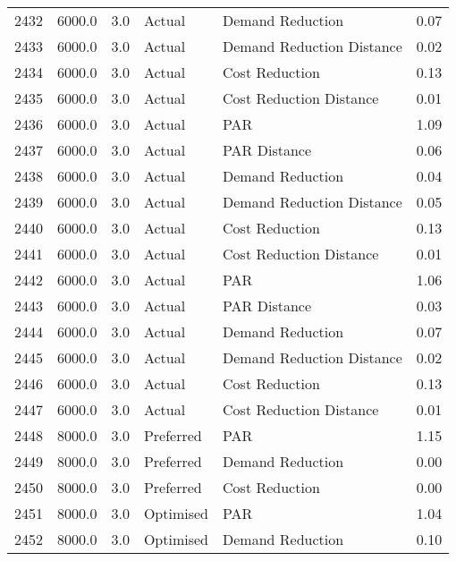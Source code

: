 \begin{longtable}{lrrllr}
2432 &       6000.0 &     3.0 &         Actual &           Demand Reduction &   0.07 \\
2433 &       6000.0 &     3.0 &         Actual &  Demand Reduction Distance &   0.02 \\
2434 &       6000.0 &     3.0 &         Actual &             Cost Reduction &   0.13 \\
2435 &       6000.0 &     3.0 &         Actual &    Cost Reduction Distance &   0.01 \\
2436 &       6000.0 &     3.0 &         Actual &                        PAR &   1.09 \\
2437 &       6000.0 &     3.0 &         Actual &               PAR Distance &   0.06 \\
2438 &       6000.0 &     3.0 &         Actual &           Demand Reduction &   0.04 \\
2439 &       6000.0 &     3.0 &         Actual &  Demand Reduction Distance &   0.05 \\
2440 &       6000.0 &     3.0 &         Actual &             Cost Reduction &   0.13 \\
2441 &       6000.0 &     3.0 &         Actual &    Cost Reduction Distance &   0.01 \\
2442 &       6000.0 &     3.0 &         Actual &                        PAR &   1.06 \\
2443 &       6000.0 &     3.0 &         Actual &               PAR Distance &   0.03 \\
2444 &       6000.0 &     3.0 &         Actual &           Demand Reduction &   0.07 \\
2445 &       6000.0 &     3.0 &         Actual &  Demand Reduction Distance &   0.02 \\
2446 &       6000.0 &     3.0 &         Actual &             Cost Reduction &   0.13 \\
2447 &       6000.0 &     3.0 &         Actual &    Cost Reduction Distance &   0.01 \\
2448 &       8000.0 &     3.0 &      Preferred &                        PAR &   1.15 \\
2449 &       8000.0 &     3.0 &      Preferred &           Demand Reduction &   0.00 \\
2450 &       8000.0 &     3.0 &      Preferred &             Cost Reduction &   0.00 \\
2451 &       8000.0 &     3.0 &      Optimised &                        PAR &   1.04 \\
2452 &       8000.0 &     3.0 &      Optimised &           Demand Reduction &   0.10 \\

\end{longtable}
